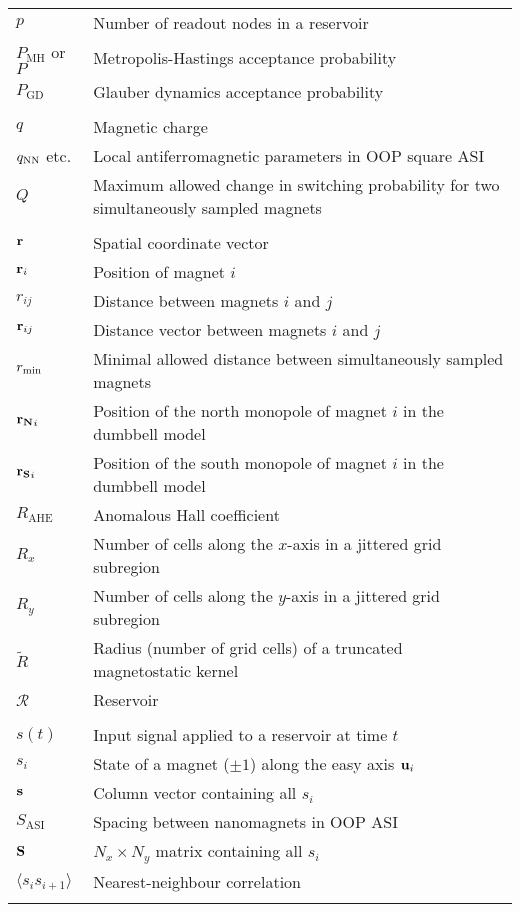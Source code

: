 \begin{longtable}[l]{p{60pt} p{350pt}}
	$p$ & Number of readout nodes in a reservoir \\
	$P_\mathrm{MH}$ or $P$ & Metropolis-Hastings acceptance probability \\
	$P_\mathrm{GD}$ & Glauber dynamics acceptance probability \\
	&\\

	$q$ & Magnetic charge \\
	$q_\mathrm{NN}$ etc. & Local antiferromagnetic parameters in OOP square ASI \\
	$Q$ & Maximum allowed change in switching probability for two simultaneously sampled magnets \\
	&\\

	$\boldsymbol{\mathbf{r}}$ & Spatial coordinate vector \\
	$\boldsymbol{\mathbf{r}}_i$ & Position of magnet $i$ \\
	$r_{ij}$ & Distance between magnets $i$ and $j$ \\
	$\boldsymbol{\mathbf{r}}_{ij}$ & Distance vector between magnets $i$ and $j$ \\
	$r_\mathrm{min}$ & Minimal allowed distance between simultaneously sampled magnets \\
	$\boldsymbol{\mathbf{r_N}}_i$ & Position of the north monopole of magnet $i$ in the dumbbell model \\
	$\boldsymbol{\mathbf{r_S}}_i$ & Position of the south monopole of magnet $i$ in the dumbbell model \\
	$R_\mathrm{AHE}$ & Anomalous Hall coefficient \\
	$R_x$ & Number of cells along the $x$-axis in a jittered grid subregion \\
	$R_y$ & Number of cells along the $y$-axis in a jittered grid subregion \\
	$\widetilde{R}$ & Radius (number of grid cells) of a truncated magnetostatic kernel \\
	$\mathcal{R}$ & Reservoir \\
	&\\

	$s(t)$ & Input signal applied to a reservoir at time $t$ \\
	$s_i$ & State of a magnet ($\pm 1$) along the easy axis $\boldsymbol{\mathbf{u}}_i$ \\
	$\boldsymbol{\mathbf{s}}$ & Column vector containing all $s_i$ \\
	$S_\mathrm{ASI}$ & Spacing between nanomagnets in OOP ASI \\
	$\boldsymbol{\mathbf{S}}$ & $N_x \times N_y$ matrix containing all $s_i$ \\
	$\langle s_i s_{i+1} \rangle$ & Nearest-neighbour correlation \\
	&\\


\end{longtable}
